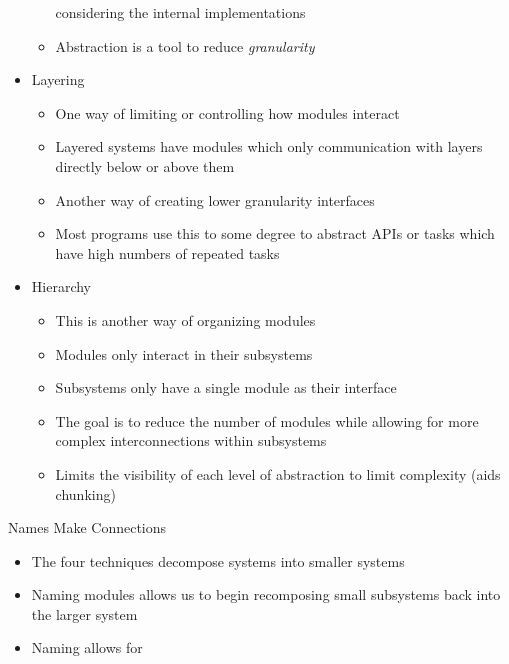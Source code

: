 \documentclass{report}
\begin{document}
\begin{description}
\begin{itemize}
\begin{itemize}
                        considering the internal implementations
                    \item Abstraction is a tool to reduce \textit{granularity}
                \end{itemize}
            \item Layering
                \begin{itemize}
                    \item One way of limiting or controlling how modules interact
                    \item Layered systems have modules which only communication with
                        layers directly below or above them
                    \item Another way of creating lower granularity interfaces
                    \item Most programs use this to some degree to abstract
                        APIs or tasks which have high numbers of repeated tasks
                \end{itemize}
            \item Hierarchy
                \begin{itemize}
                    \item This is another way of organizing modules
                    \item Modules only interact in their subsystems
                    \item Subsystems only have a single module as their interface
                    \item The goal is to reduce the number of modules while allowing
                        for more complex interconnections within subsystems
                    \item Limits the visibility of each level of abstraction to limit
                        complexity (aids chunking)
                \end{itemize}
        \end{itemize}
    \item Names Make Connections
        \begin{itemize}
            \item The four techniques decompose systems into smaller systems
            \item Naming modules allows us to begin recomposing small subsystems back
                into the larger system
            \item Naming allows for
                \begin{itemize}

\end{itemize}
\end{itemize}
\end{description}
\end{document}
